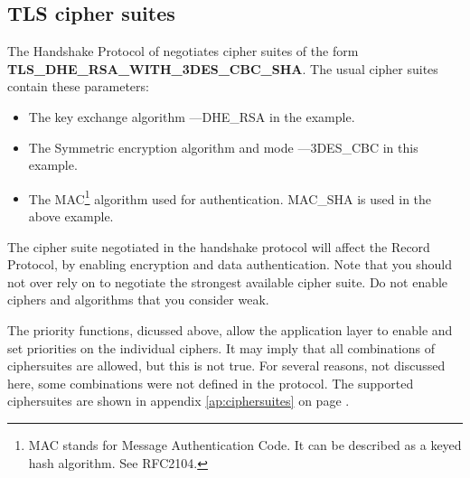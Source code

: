 \subsection*{TLS cipher suites}
\par 
The Handshake Protocol of \tlsI{} negotiates cipher suites 
of the form \\
{\bf TLS\_DHE\_RSA\_WITH\_3DES\_CBC\_SHA}.
The usual cipher suites contain these parameters:
\begin{itemize}
\item The key exchange algorithm ---DHE\_RSA in the example.
\item The Symmetric encryption algorithm and mode ---3DES\_CBC in this
example.
\item The MAC\footnote{MAC stands for Message Authentication Code. It can
be described as a keyed hash algorithm. See RFC2104.} algorithm used for authentication.
MAC\_SHA is used in the above example.
\end{itemize}

The cipher suite negotiated in the handshake protocol will affect
the Record Protocol, by enabling encryption and data authentication.
Note that you should not over rely on \tls{} to negotiate the strongest 
available cipher suite. Do not enable ciphers and algorithms that you consider weak.
\par
The priority functions, dicussed above, allow the application layer to enable
and set priorities on the individual ciphers. It may imply that all combinations of ciphersuites
are allowed, but this is not true. For several reasons, not discussed here, some combinations 
were not defined in the \tls{} protocol. The supported ciphersuites are shown
in appendix \ref{ap:ciphersuites} on page \pageref{ap:ciphersuites}.

\addvspace{1.5cm}
